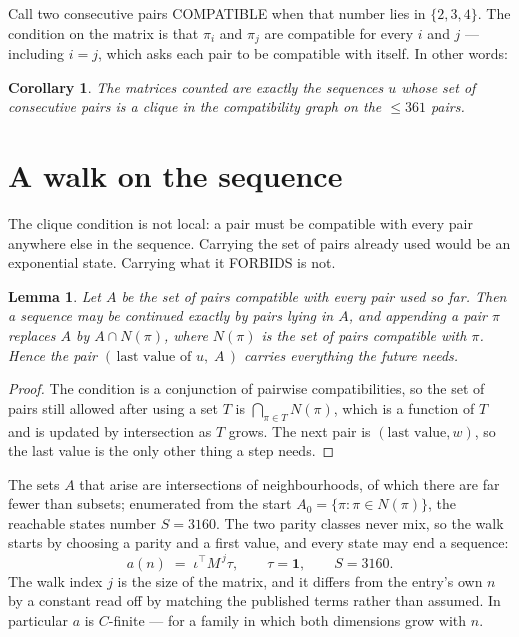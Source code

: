\documentclass[11pt,a4paper]{article}
\theoremstyle{plain}
\newtheorem{lemma}[theorem]{Lemma}
\newtheorem{corollary}[theorem]{Corollary}
\theoremstyle{definition}
\begin{document}
Call two consecutive pairs COMPATIBLE when that number lies in $\{2,3,4\}$. The condition on the
matrix is that $\pi_i$ and $\pi_j$ are compatible for every $i$ and $j$ --- including $i=j$,
which asks each pair to be compatible with itself. In other words:

\begin{corollary}
The matrices counted are exactly the sequences $u$ whose set of consecutive pairs is a clique in
the compatibility graph on the $\le 361$ pairs.
\end{corollary}

\section{A walk on the sequence}

The clique condition is not local: a pair must be compatible with every pair anywhere else in
the sequence. Carrying the set of pairs already used would be an exponential state. Carrying
what it FORBIDS is not.

\begin{lemma}\label{lem:lump}
Let $A$ be the set of pairs compatible with every pair used so far. Then a sequence may be
continued exactly by pairs lying in $A$, and appending a pair $\pi$ replaces $A$ by
$A\cap N(\pi)$, where $N(\pi)$ is the set of pairs compatible with $\pi$. Hence the pair
$(\,\text{last value of }u,\;A\,)$ carries everything the future needs.
\end{lemma}

\begin{proof}
The condition is a conjunction of pairwise compatibilities, so the set of pairs still allowed
after using a set $T$ is $\bigcap_{\pi\in T}N(\pi)$, which is a function of $T$ and is updated
by intersection as $T$ grows. The next pair is $(\text{last value},w)$, so the last value is
the only other thing a step needs.
\end{proof}

The sets $A$ that arise are intersections of neighbourhoods, of which there are far fewer than
subsets; enumerated from the start $A_0=\{\pi:\pi\in N(\pi)\}$, the reachable states number
$S=3160$. The two parity classes never mix, so the walk starts by choosing a parity and a first
value, and every state may end a sequence:
\[
a(n)\;=\;\iota^{\!\top}M^{\,j}\tau ,\qquad \tau=\mathbf{1},\qquad S=3160.
\]
The walk index $j$ is the size of the matrix, and it differs from the entry's own $n$ by a
constant read off by matching the published terms rather than assumed. In particular $a$ is
$C$-finite --- for a family in which both dimensions grow with $n$.
\end{document}
